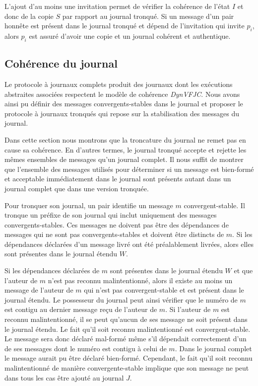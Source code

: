 L'ajout d'au moins une invitation permet de vérifier la cohérence de l'état $I$ et donc de la copie $S$ par rapport au journal tronqué.
Si un message d'un pair honnête est présent dans le journal tronqué et dépend de l'invitation qui invite $p_i$, alors $p_i$ est assuré d'avoir une copie et un journal cohérent et authentique.


\subsection{Cohérence du journal}

Le protocole à journaux complets produit des journaux dont les exécutions abstraites associées respectent le modèle de cohérence \emph{DynVFJC}.
Nous avons ainsi pu définir des messages convergents-stables dans le journal et proposer le protocole à journaux tronqués qui repose sur la stabilisation des messages du journal.

Dans cette section nous montrons que la troncature du journal ne remet pas en cause sa cohérence.
En d'autres termes, le journal tronqué accepte et rejette les mêmes ensembles de messages qu'un journal complet.
Il nous suffit de montrer que l'ensemble des messages utilisés pour déterminer si un message est bien-formé et acceptable immédiatement dans le journal sont présents autant dans un journal complet que dans une version tronquée.

Pour tronquer son journal, un pair identifie un message $m$ convergent-stable.
Il tronque un préfixe de son journal qui inclut uniquement des messages convergents-stables.
Ces messages ne doivent pas être des dépendances de messages qui ne sont pas convergents-stables et doivent être distincts de $m$.
Si les dépendances déclarées d'un message livré ont été préalablement livrées, alors elles sont présentes dans le journal étendu $W$.

Si les dépendances déclarées de $m$ sont présentes dans le journal étendu $W$ et que l'auteur de $m$ n'est pas reconnu malintentionné, alors il existe au moins un message de l'auteur de $m$ qui n'est pas convergent-stable et est présent dans le journal étendu.
Le possesseur du journal peut ainsi vérifier que le numéro de $m$ est contigu au dernier message reçu de l'auteur de $m$.
Si l'auteur de $m$ est reconnu malintentionné, il se peut qu'aucun de ses message ne soit présent dans le journal étendu.
Le fait qu'il soit reconnu malintentionné est convergent-stable.
Le message sera donc déclaré mal-formé même s'il dépendait correctement d'un de ses messages dont le numéro est contigu à celui de $m$.
Dans le journal complet le message aurait pu être déclaré bien-formé.
Cependant, le fait qu'il soit reconnu malintentionné de manière convergente-stable implique que son message ne peut dans tous les cas être ajouté au journal $J$.

